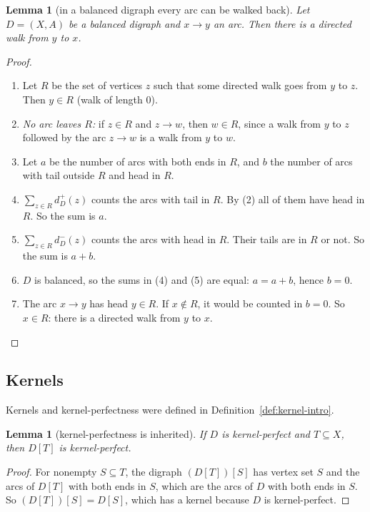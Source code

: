 \documentclass[11pt]{article}
\theoremstyle{plain}
\newtheorem{lemma}[theorem]{Lemma}
\theoremstyle{definition}
\theoremstyle{remark}
\newcommand{\dout}{d^{+}}
\newcommand{\din}{d^{-}}
\newenvironment{steps}{\begin{enumerate}[label=(\arabic*),leftmargin=2.2em,itemsep=0.35em]}{\end{enumerate}}
\begin{document}
\begin{lemma}[in a balanced digraph every arc can be walked back]\label{lem:balanced}
Let $D=(X,A)$ be a balanced digraph and $x\to y$ an arc. Then there is a directed walk from $y$
to $x$.
\end{lemma}

\begin{proof}
\begin{steps}
  \item Let $R$ be the set of vertices $z$ such that some directed walk goes from $y$ to $z$.
    Then $y\in R$ (walk of length $0$).
  \item \emph{No arc leaves $R$:} if $z\in R$ and $z\to w$, then $w\in R$, since a walk from $y$
    to $z$ followed by the arc $z\to w$ is a walk from $y$ to $w$.
  \item Let $a$ be the number of arcs with both ends in $R$, and $b$ the number of arcs with
    tail outside $R$ and head in $R$.
  \item $\sum_{z\in R}\dout_D(z)$ counts the arcs with tail in $R$. By (2) all of them have head
    in $R$. So the sum is $a$.
  \item $\sum_{z\in R}\din_D(z)$ counts the arcs with head in $R$. Their tails are in $R$ or not.
    So the sum is $a+b$.
  \item $D$ is balanced, so the sums in (4) and (5) are equal: $a=a+b$, hence $b=0$.
  \item The arc $x\to y$ has head $y\in R$. If $x\notin R$, it would be counted in $b=0$. So
    $x\in R$: there is a directed walk from $y$ to $x$. \qedhere
\end{steps}
\end{proof}

\subsection{Kernels}

Kernels and kernel-perfectness were defined in Definition~\ref{def:kernel-intro}.

\begin{lemma}[kernel-perfectness is inherited]\label{lem:hereditary}
If $D$ is kernel-perfect and $T\subseteq X$, then $D[T]$ is kernel-perfect.
\end{lemma}

\begin{proof}
For nonempty $S\subseteq T$, the digraph $(D[T])[S]$ has vertex set $S$ and the arcs of $D[T]$
with both ends in $S$, which are the arcs of $D$ with both ends in $S$. So $(D[T])[S]=D[S]$,
which has a kernel because $D$ is kernel-perfect.
\end{proof}
\end{document}

